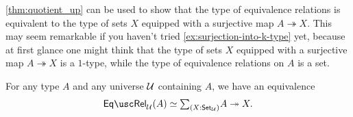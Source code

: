 \cref{thm:quotient_up} can be used to show that the type of equivalence relations is equivalent to the type of sets $X$ equipped with a surjective map $A\twoheadrightarrow X$. This may seem remarkable if you haven't tried \cref{ex:surjection-into-k-type} yet, because at first glance one might think that the type of sets $X$ equipped with a surjective map $A\twoheadrightarrow X$ is a $1$-type, while the type of equivalence relations on $A$ is a set.

\begin{thm}\label{thm:eqrel-surj}
  For any type $A$ and any universe $\mathcal{U}$ containing $A$, we have an equivalence
  \begin{equation*}
    \eqrel_\UU(A)\simeq\sm{X:\Set_\UU}A\twoheadrightarrow X.
  \end{equation*}
\end{thm}

